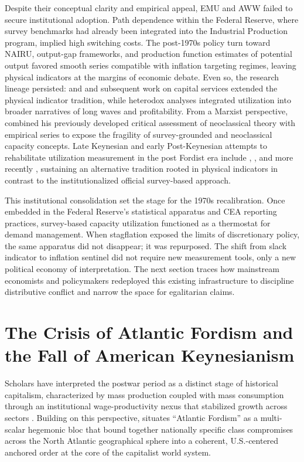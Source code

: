 \documentclass[11pt]{article}
\begin{document}
Despite their conceptual clarity and empirical appeal, EMU and AWW failed to secure institutional adoption. Path dependence within the Federal Reserve, where survey benchmarks had already been integrated into the Industrial Production program, implied high switching costs. The post-1970s policy turn toward NAIRU, output-gap frameworks, and production function estimates of potential output favored smooth series compatible with inflation targeting regimes, leaving physical indicators at the margins of economic debate. Even so, the research lineage persisted: \citet{foss1981} and \citet{foss1985} and subsequent work on capital services extended the physical indicator tradition, while heterodox analyses integrated utilization into broader narratives of long waves and profitability. From a Marxist perspective, \citet{shaikh1992} combined his previously developed critical assessment of neoclassical theory \citep{shaikh1974} with empirical series to expose the fragility of survey-grounded and neoclassical capacity concepts. Late Keynesian and early Post-Keynesian attempts to rehabilitate utilization measurement in the post Fordist era include \citet{orr1989}, \citet{beaulieumattey1998}, and more recently \citet{nikiforos2016}, sustaining an alternative tradition rooted in physical indicators in contrast to the institutionalized official survey-based approach.

This institutional consolidation set the stage for the 1970s recalibration. Once embedded in the Federal Reserve's statistical apparatus and CEA reporting practices, survey-based capacity utilization functioned as a thermostat for demand management. When stagflation exposed the limits of discretionary policy, the same apparatus did not disappear; it was repurposed. The shift from slack indicator to inflation sentinel did not require new measurement tools, only a new political economy of interpretation. The next section traces how mainstream economists and policymakers redeployed this existing infrastructure to discipline distributive conflict and narrow the space for egalitarian claims.


\section{The Crisis of Atlantic Fordism and the Fall of American Keynesianism}

Scholars have interpreted the postwar period as a distinct stage of historical capitalism, characterized by mass production coupled with mass consumption through an institutional wage-productivity nexus that stabilized growth across sectors \citep{aglietta2000}. Building on this perspective, \citet{vidal2015} situates ``Atlantic Fordism'' as a multi-scalar hegemonic bloc that bound together nationally specific class compromises across the North Atlantic geographical sphere into a coherent, U.S.-centered anchored order at the core of the capitalist world system.
\end{document}
